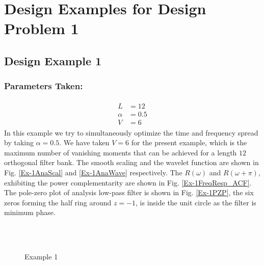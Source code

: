 \section{Design Examples for Design Problem 1}
\label{sec: DEX DP1}
\subsection{Design Example 1}
\label{Design Example 1}
\subsubsection{Parameters Taken:}
\begin{eqnarray*}
\begin{aligned}
L &= 12\\
\alpha &= 0.5\\
V &= 6
\end{aligned}
\end{eqnarray*}
In this example we try to simultaneously optimize the time and frequency spread by taking $\alpha = 0.5$. We have taken $V=6$ for the present example, which is the maximum number of vanishing moments that can be achieved for a length $12$ orthogonal filter bank. The smooth scaling and the wavelet function are shown in Fig. \ref{Ex-1AnaScal} and \ref{Ex-1AnaWave} respectively. The $R(\omega)$ and $R(\omega + \pi)$, exhibiting the power complementarity are shown in Fig. \ref{Ex-1FreqResp_ACF}. The pole-zero plot of analysis low-pass filter is shown in Fig. \ref{Ex-1PZP}, the six zeros forming the half ring around $z=-1$, is inside the unit circle as the filter is minimum phase.

\begin{figure*}
\centering
{}
\\
\\
%

\caption{Example 1}
\label{Example 1}
\end{figure*}

